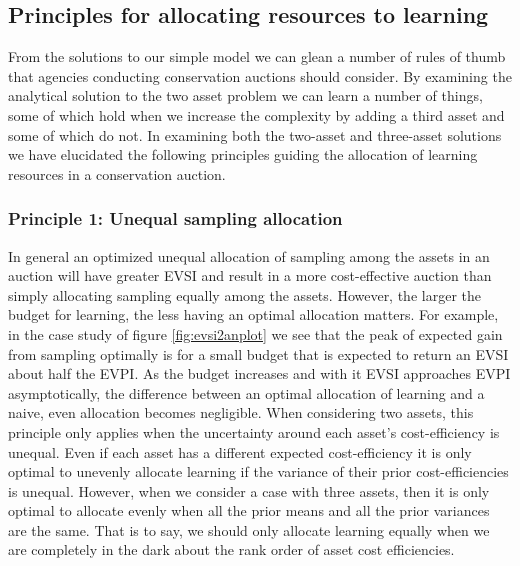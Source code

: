 \documentclass[]{article}
\theoremstyle{definition}
\theoremstyle{definition}
\theoremstyle{remark}
\begin{document}
\subsection*{Principles for allocating resources to
learning}\label{principles-for-allocating-resources-to-learning}

From the solutions to our simple model we can glean a number of rules of
thumb that agencies conducting conservation auctions should consider. By
examining the analytical solution to the two asset problem we can learn
a number of things, some of which hold when we increase the complexity
by adding a third asset and some of which do not. In examining both the
two-asset and three-asset solutions we have elucidated the following
principles guiding the allocation of learning resources in a
conservation auction.

\subsubsection*{Principle 1: Unequal sampling
allocation}\label{principle-1-unequal-sampling-allocation}

In general an optimized unequal allocation of sampling among the assets
in an auction will have greater EVSI and result in a more cost-effective
auction than simply allocating sampling equally among the assets.
However, the larger the budget for learning, the less having an optimal
allocation matters. For example, in the case study of figure
\ref{fig:evsi2anplot} we see that the peak of expected gain from
sampling optimally is for a small budget that is expected to return an
EVSI about half the EVPI. As the budget increases and with it EVSI
approaches EVPI asymptotically, the difference between an optimal
allocation of learning and a naive, even allocation becomes negligible.
When considering two assets, this principle only applies when the
uncertainty around each asset's cost-efficiency is unequal. Even if each
asset has a different expected cost-efficiency it is only optimal to
unevenly allocate learning if the variance of their prior
cost-efficiencies is unequal. However, when we consider a case with
three assets, then it is only optimal to allocate evenly when all the
prior means and all the prior variances are the same. That is to say, we
should only allocate learning equally when we are completely in the dark
about the rank order of asset cost efficiencies.
\end{document}
